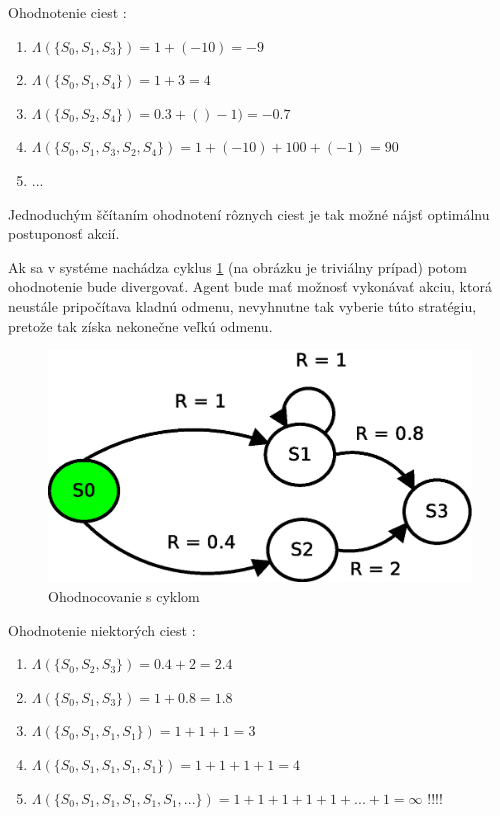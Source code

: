 Ohodnotenie ciest :
\begin{enumerate}
  \item $\Lambda(\{S_0, S_1, S_3\}) = 1+(-10) = -9$
  \item $\Lambda(\{S_0, S_1, S_4\}) = 1+3 = 4$
  \item $\Lambda(\{S_0, S_2, S_4\}) = 0.3 +()-1) =-0.7$
  \item $\Lambda(\{S_0, S_1, S_3, S_2, S_4\}) = 1 +(-10) +100 + (-1) = 90$
  \item ...
\end{enumerate}

Jednoduchým ščítaním ohodnotení rôznych ciest je tak možné nájsť optimálnu
postuponosť akcií.

Ak sa v systéme nachádza cyklus \ref{img:cycle_states_system} (na obrázku
je triviálny prípad) potom ohodnotenie bude divergovať. Agent bude mať možnosť
vykonávať akciu, ktorá neustále pripočítava kladnú odmenu, nevyhnutne tak
vyberie túto stratégiu, pretože tak získa nekonečne veľkú odmenu.

\begin{figure}[!htb]
\centering
\includegraphics[scale=.6]{../diagrams/rf_cycle_states.eps}
\caption{Ohodnocovanie s cyklom}
\label{img:cycle_states_system}
\end{figure}

Ohodnotenie niektorých ciest :
\begin{enumerate}
  \item $\Lambda(\{S_0, S_2, S_3\}) = 0.4+2 = 2.4$
  \item $\Lambda(\{S_0, S_1, S_3\}) = 1+0.8 = 1.8$
  \item $\Lambda(\{S_0, S_1, S_1, S_1\}) = 1+1+1 = 3$
  \item $\Lambda(\{S_0, S_1, S_1, S_1, S_1\}) = 1+1+1+1 = 4$
  \item $\Lambda(\{S_0, S_1, S_1, S_1, S_1, S_1, ...\}) = 1+1+1+1+1+...+1 = \infty$ !!!!
\end{enumerate}

